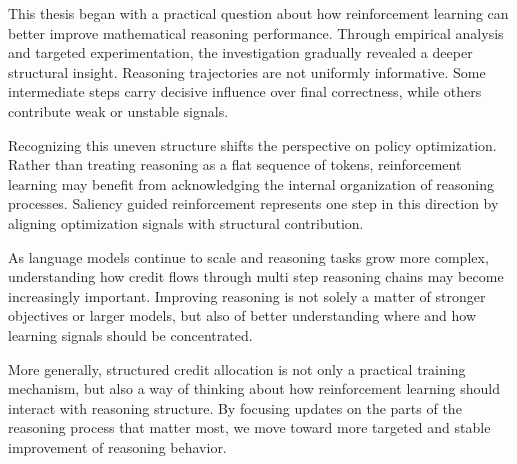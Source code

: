 \documentclass[12pt]{report}
\begin{document}
This thesis began with a practical question about how reinforcement learning can better improve mathematical reasoning performance. Through empirical analysis and targeted experimentation, the investigation gradually revealed a deeper structural insight. Reasoning trajectories are not uniformly informative. Some intermediate steps carry decisive influence over final correctness, while others contribute weak or unstable signals.

Recognizing this uneven structure shifts the perspective on policy optimization. Rather than treating reasoning as a flat sequence of tokens, reinforcement learning may benefit from acknowledging the internal organization of reasoning processes. Saliency guided reinforcement represents one step in this direction by aligning optimization signals with structural contribution.

As language models continue to scale and reasoning tasks grow more complex, understanding how credit flows through multi step reasoning chains may become increasingly important. Improving reasoning is not solely a matter of stronger objectives or larger models, but also of better understanding where and how learning signals should be concentrated.

More generally, structured credit allocation is not only a practical training mechanism, but also a way of thinking about how reinforcement learning should interact with reasoning structure. By focusing updates on the parts of the reasoning process that matter most, we move toward more targeted and stable improvement of reasoning behavior.

\clearpage
{}
{}
\renewcommand{\bibname}{References}
 



\appendix

\renewcommand{\thesection}{A.\arabic{section}}
\titleformat{\section}{\normalfont\bfseries}{\thesection}{1em}{}
\titleformat{\paragraph}[block]{\bfseries}{ }{0pt}{}
\end{document}
